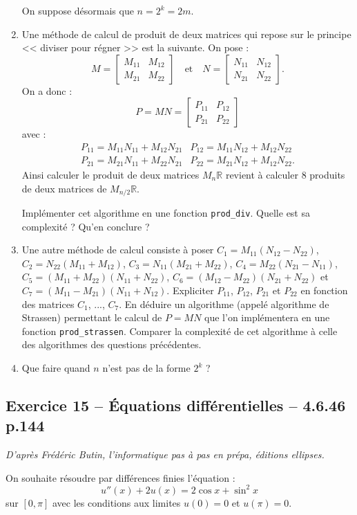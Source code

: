 \documentclass[10pt,fleqn]{article} %
\begin{document}
\begin{multicols}{2}
\begin{enumerate}
On suppose désormais que $n=2^k=2m$.
\item Une méthode de calcul de produit de deux matrices qui repose sur le principe << diviser pour régner >> est la suivante. On pose : 
$$
M=
\begin{bmatrix}
M_{11} & M_{12} \\
M_{21} & M_{22}
\end{bmatrix} 
\quad
\text{et}
\quad
N=
\begin{bmatrix}
N_{11} & N_{12} \\
N_{21} & N_{22}
\end{bmatrix} .
$$
On a donc :
$$
P=MN = 
\begin{bmatrix}
P_{11} & P_{12} \\
P_{21} & P_{22}
\end{bmatrix}
$$
avec :
$$
\begin{array}{ll}
P_{11} = M_{11}N_{11} + M_{12}N_{21} & 
P_{12} = M_{11}N_{12} + M_{12}N_{22} \\
P_{21} = M_{21}N_{11} + M_{22}N_{21} & 
P_{22} = M_{21}N_{12} + M_{12}N_{22}.
\end{array}
$$
Ainsi calculer le produit de deux matrices $M_n\mathbb{R}$ revient à calculer 8 produits de deux matrices de $M_{n/2}\mathbb{R}$.

Implémenter cet algorithme en une fonction \texttt{prod\_div}. Quelle est sa complexité ? Qu'en conclure ?
\item Une autre méthode de calcul consiste à poser 
$C_1 =M_{11}\left(N_{12} - N_{22} \right)$, 
$C_2 =N_{22}\left(M_{11} + M_{12} \right)$, 
$C_3 =N_{11}\left(M_{21} + M_{22}\right)$, 
$C_4 =M_{22}\left(N_{21} - N_{11} \right)$, 
$C_5 =\left(M_{11} + M_{22} \right) \left(N_{11} + N_{22} \right)$, 
$C_6 =\left(M_{12} - M_{22} \right)\left(N_{21} + N_{22} \right)$
et
$C_7 =\left(M_{11} - M_{21} \right)\left(N_{11} + N_{12} \right)$. Expliciter $P_{11}$, $P_{12}$, $P_{21}$ et $P_{22}$ en fonction des matrices $C_1$, ..., $C_7$. En déduire un algorithme (appelé algorithme de Strassen) permettant le calcul de $P=MN$ que l'on implémentera en une fonction \texttt{prod\_strassen}. Comparer la complexité de cet algorithme à celle des algorithmes des questions précédentes. 
\item Que faire quand $n$ n'est pas de la forme $2^k$ ?
\end{enumerate}


\subsection*{Exercice 15 -- Équations différentielles -- 4.6.46 p.144}
\begin{flushright}
\textit{D'après Frédéric Butin, l'informatique pas à pas en prépa, éditions ellipses.}
\end{flushright}
On souhaite résoudre par différences finies l'équation :
$$
u''(x)+2u(x) = 2 \cos x + \sin^2 x
$$
sur $[0,\pi]$ avec les conditions aux limites $u(0)=0$ et $u(\pi)=0$.


\end{multicols}
\end{document}
